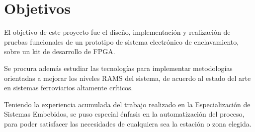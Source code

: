 %		
	\section{Objetivos}
	
		El objetivo de este proyecto fue el diseño, implementación y realización de pruebas funcionales de un prototipo de sistema electrónico de enclavamiento, sobre un kit de desarrollo de FPGA. 
		
		Se procura además estudiar las tecnologías para implementar metodologías orientadas a mejorar los niveles RAMS del sistema, de acuerdo al estado del arte en sistemas ferroviarios altamente críticos. 
		
		Teniendo la experiencia acumulada del trabajo realizado en la Especialización de Sistemas Embebidos, se puso especial énfasis en la automatización del proceso, para poder satisfacer las necesidades de cualquiera sea la estación o zona elegida. 

